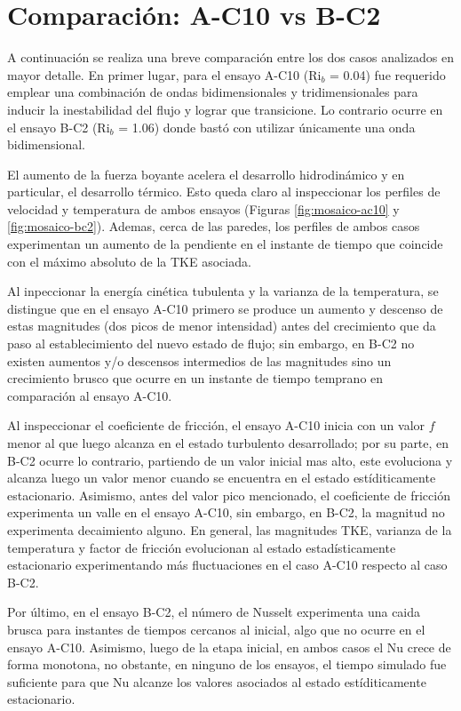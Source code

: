 \section{Comparación: A-C10 vs B-C2}

A continuación se realiza una breve comparación entre los dos casos analizados en mayor detalle. En primer lugar, para el ensayo A-C10 (Ri$_b$ = 0.04) fue requerido emplear una combinación de ondas bidimensionales y tridimensionales para inducir la inestabilidad del flujo y lograr que transicione. Lo contrario ocurre en el ensayo B-C2 (Ri$_b$ = 1.06) donde bastó con utilizar únicamente una onda bidimensional.

El aumento de la fuerza boyante acelera el desarrollo hidrodinámico y en particular, el desarrollo térmico. Esto queda claro al inspeccionar los perfiles de velocidad y temperatura de ambos ensayos (Figuras \ref{fig:mosaico-ac10} y \ref{fig:mosaico-bc2}). Ademas, cerca de las paredes, los perfiles de ambos casos experimentan un aumento de la pendiente en el instante de tiempo que coincide con el máximo absoluto de la TKE asociada.

Al inpeccionar la energía cinética tubulenta y la varianza de la temperatura, se distingue que en el ensayo A-C10 primero se produce un aumento y descenso de estas magnitudes (dos picos de menor intensidad) antes del crecimiento que da paso al establecimiento del nuevo estado de flujo; sin embargo, en B-C2 no existen aumentos y/o descensos intermedios de las magnitudes sino un crecimiento brusco que ocurre en un instante de tiempo temprano en comparación al ensayo A-C10.

Al inspeccionar el coeficiente de fricción, el ensayo A-C10 inicia con un valor $f$ menor al que luego alcanza en el estado turbulento desarrollado; por su parte, en B-C2 ocurre lo contrario, partiendo de un valor inicial mas alto, este evoluciona y alcanza luego un valor menor cuando se encuentra en el estado estíditicamente estacionario. Asimismo, antes del valor pico mencionado, el coeficiente de fricción experimenta un valle en el ensayo A-C10, sin embargo, en B-C2, la magnitud no experimenta decaimiento alguno. En general, las magnitudes TKE, varianza de la temperatura y factor de fricción evolucionan al estado estadísticamente estacionario experimentando más fluctuaciones en el caso A-C10 respecto al caso B-C2.

Por último, en el ensayo B-C2, el número de Nusselt experimenta una caida brusca para instantes de tiempos cercanos al inicial, algo que no ocurre en el ensayo A-C10. Asimismo, luego de la etapa inicial, en ambos casos el Nu crece de forma monotona, no obstante, en ninguno de los ensayos, el tiempo simulado fue suficiente para que Nu alcanze los valores asociados al estado estíditicamente estacionario.



